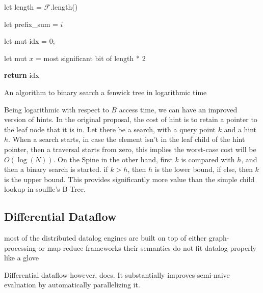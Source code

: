 \documentclass[manuscript,screen,review]{acmart}
\theoremstyle{definition}
\begin{document}
\begin{algorithm} [!h]
	\scriptsize
	\BlankLine

	let length = $\mathcal{F}$.length()

	let prefix_sum = $i$

	let mut idx = 0;

	let mut $x$ = most significant bit of length * 2



	\textbf{return} idx
	\caption{An algorithm to binary search a fenwick tree in logarithmic time}
	\label{alg:fen_tree}
\end{algorithm}

Being logarithmic with respect to $B$ access time, we can have an improved version of hints. In the original proposal, the cost of hint is to retain a pointer
to the leaf node that it is in. Let there be a search, with a query point $k$ and a hint $h$. When a search starts, in case the element isn't in the leaf
child of the hint pointer, then a traversal starts from zero, this implies the worst-case cost will be $O(\log(N))$. On the Spine in the other hand, first $k$
is compared with $h$, and then a binary search is started. if $k > h$, then $h$ is the lower bound, if else, then $k$ is the upper bound. This provides
significantly more value than the simple child lookup in souffle's B-Tree.


\subsection{Differential Dataflow}

most of the distributed datalog engines are built on top of either graph-processing or map-reduce frameworks
their semantics do not fit datalog properly like a glove

Differential dataflow however, does. It substantially improves semi-naive evaluation by automatically parallelizing it.
\end{document}
